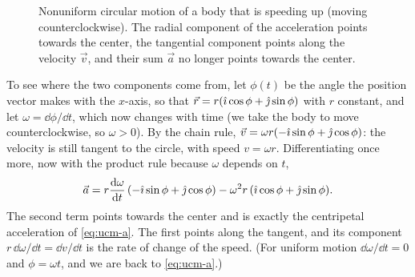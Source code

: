 \documentclass[11pt,a4paper]{article}
\begin{document}
\begin{figure}[ht]
\centering
\begin{minipage}[c]{0.46\textwidth}
\centering
{}
\end{minipage}\hfill
\begin{minipage}[c]{0.46\textwidth}
\caption{Nonuniform circular motion of a body that is speeding up (moving counterclockwise). The
radial component of the acceleration points towards the center, the tangential component points
along the velocity $\vec{v}$, and their sum $\vec{a}$ no longer points towards the
center.}\label{fig:nucm}
\end{minipage}
\end{figure}

To see where the two components come from, let $\phi(t)$ be the angle the position vector makes
with the $x$-axis, so that $\vec{r} = r(\hat{\imath}\cos\phi + \hat{\jmath}\sin\phi)$ with $r$ constant, and let
$\omega = \dd\phi/\dd t$, which now changes with time (we take the body to move counterclockwise,
so $\omega > 0$). By the chain rule, $\vec{v} = \omega r(-\hat{\imath}\sin\phi + \hat{\jmath}\cos\phi)$: the
velocity is still tangent to the circle, with speed $v = \omega r$. Differentiating once more, now
with the product rule because $\omega$ depends on $t$,
\[
  \vec{a} = r\frac{\mathrm{d} \omega}{\mathrm{d} t}\,(-\hat{\imath}\sin\phi + \hat{\jmath}\cos\phi) - \omega^2 r\,(\hat{\imath}\cos\phi + \hat{\jmath}\sin\phi) .
\]
The second term points towards the center and is exactly the centripetal acceleration of
\eqref{eq:ucm-a}. The first points along the tangent, and its component
$r\,\dd\omega/\dd t = \dd v/\dd t$ is the rate of change of the speed. (For uniform motion
$\dd\omega/\dd t = 0$ and $\phi = \omega t$, and we are back to \eqref{eq:ucm-a}.)
\end{document}

